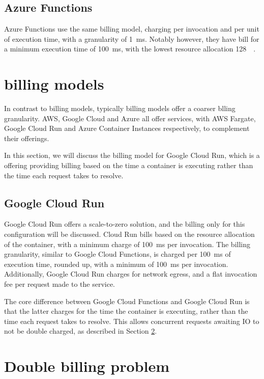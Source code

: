 \subsection{Azure Functions}
Azure Functions use the same billing model, charging per invocation and per unit of execution time, with a granularity of \SI{1}{\milli\second}\cite{PricingFunctionsMicrosoft}. Notably however, they have bill for a minimum execution time of \SI{100}{\milli\second}, with the lowest resource allocation \SI{128}{\mega\byte}.

\section{\caas{} billing models}
In contrast to \faas{} billing models, typically \caasxlong{} billing models offer a coarser blling granularity. AWS, Google Cloud and Azure all offer \caas{} services, with AWS Fargate, Google Cloud Run and Azure Container Instances respectively, to complement their \faas{} offerings.

In this section, we will discuss the billing model for Google Cloud Run, which is a \caas{} offering providing billing based on the time a container is executing rather than the time each request takes to resolve.

\subsection{Google Cloud Run}
\label{sec:cloud-run-billing-model}
Google Cloud Run offers a scale-to-zero solution, and the billing only for this configuration will be discussed. Cloud Run bills based on the resource allocation of the container, with a minimum charge of \SI{100}{\milli\second} per invocation\cite{PricingCloudRun}. The billing granularity, similar to Google Cloud Functions, is charged per \SI{100}{\milli\second} of execution time, rounded up, with a minimum of \SI{100}{\milli\second} per invocation. Additionally, Google Cloud Run charges for network egress, and a flat invocation fee per request made to the service.

The core difference between Google Cloud Functions and Google Cloud Run is that the latter charges for the time the container is executing, rather than the time each request takes to resolve. This allows concurrent requests awaiting IO to not be double charged, as described in Section \ref{sec:double-billing-problem}.

\section{Double billing problem}
\label{sec:double-billing-problem}

